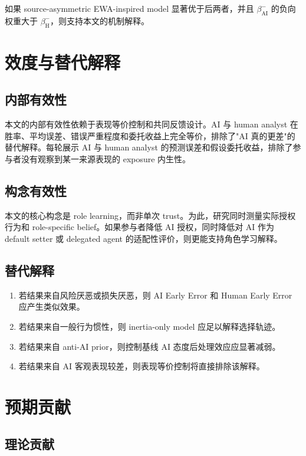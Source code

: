 \documentclass[12pt]{article}
\begin{document}
如果 source-asymmetric EWA-inspired model 显著优于后两者，并且 $\beta_{\text{AI}}^{-}$ 的负向权重大于 $\beta_{\text{H}}^{-}$，则支持本文的机制解释。

\section{效度与替代解释}

\subsection{内部有效性}

本文的内部有效性依赖于表现等价控制和共同反馈设计。AI 与 human analyst 在胜率、平均误差、错误严重程度和委托收益上完全等价，排除了"AI 真的更差"的替代解释。每轮展示 AI 与 human analyst 的预测误差和假设委托收益，排除了参与者没有观察到某一来源表现的 exposure 内生性。

\subsection{构念有效性}

本文的核心构念是 role learning，而非单次 trust。为此，研究同时测量实际授权行为和 role-specific belief。如果参与者降低 AI 授权，同时降低对 AI 作为 default setter 或 delegated agent 的适配性评价，则更能支持角色学习解释。

\subsection{替代解释}
\begin{enumerate}[label=\arabic*.]
    \item 若结果来自风险厌恶或损失厌恶，则 AI Early Error 和 Human Early Error 应产生类似效果。
    \item 若结果来自一般行为惯性，则 inertia-only model 应足以解释选择轨迹。
    \item 若结果来自 anti-AI prior，则控制基线 AI 态度后处理效应应显著减弱。
    \item 若结果来自 AI 客观表现较差，则表现等价控制将直接排除该解释。
\end{enumerate}

\section{预期贡献}

\subsection{理论贡献}
\end{document}
